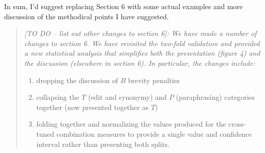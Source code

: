 \documentclass[letterpaper,12pt]{article}
\newenvironment{response}
{\begin{quotation} \it}
  {\end{quotation}}
\begin{document}
In sum, I'd suggest replacing Section 6 with some actual examples and
more discussion of the methodical points I have suggested.
\begin{response}
  [TO DO -- list out other changes to section 6]: We have made a number of changes to section 6.  We have
  revisited the two-fold validation and provided a new statistical
  analysis that simplifies both the presentation (figure 4) and the
  discussion (elsewhere in section 6). In particular, the changes
  include:
  \begin{enumerate}
  \item dropping the discussion of $B$ brevity penalties
  \item collapsing the $T$ (edit and synonymy) and $P$ (paraphrasing)
    categories together (now presented together as $T$)
  \item folding together and normalizing the values produced for the
    cross-tuned combination measures to provide a single value and
    confidence interval rather than presenting both splits.
  \end{enumerate}
\end{response}
\end{document}
